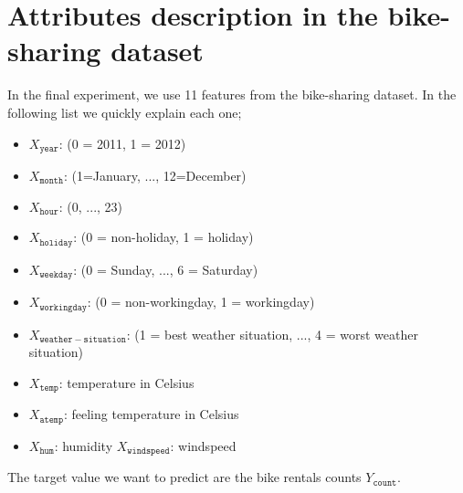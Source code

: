 \documentclass[wcp]{jmlr}
\begin{document}
\section{Attributes description in the bike-sharing dataset}

In the final experiment, we use 11 features from the bike-sharing
dataset. In the following list we quickly explain each one;

\begin{itemize}
\item \( X_{\mathtt{year}}\): (0 = 2011, 1 = 2012)
\item \( X_{\mathtt{month}}\): (1=January, ..., 12=December)
\item \( X_{\mathtt{hour}}\): (0, ..., 23)
\item \( X_{\mathtt{holiday}}\): (0 = non-holiday, 1 = holiday)
\item \( X_{\mathtt{weekday}}\): (0 = Sunday, ..., 6 = Saturday)
\item \( X_{\mathtt{workingday}}\): (0 = non-workingday, 1 = workingday)
\item \( X_{\mathtt{weather-situation}}\): (1 = best weather situation, ..., 4 = worst weather situation)
\item \( X_{\mathtt{temp}}\): temperature in Celsius
\item \( X_{\mathtt{atemp}}\): feeling temperature in Celsius
\item \( X_{\mathtt{hum}}\): humidity
\( X_{\mathtt{windspeed}}\): windspeed
\end{itemize}

The target value we want to predict are the bike rentals counts
\( Y_{\mathtt{count}}\).
\end{document}
